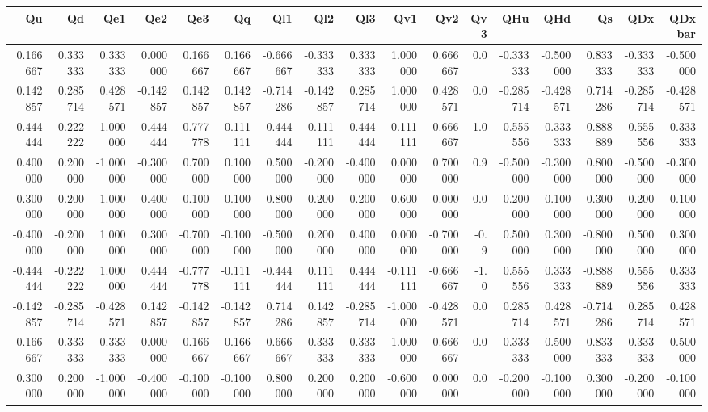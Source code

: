 \begin{tabular}{rrrrrrrrrrrrrrrrr}
\toprule
       Qu &        Qd &       Qe1 &       Qe2 &       Qe3 &        Qq &       Ql1 &       Ql2 &       Ql3 &       Qv1 &       Qv2 &  Qv3 &       QHu &       QHd &        Qs &       QDx &    QDxbar \\
\midrule
 0.166667 &  0.333333 &  0.333333 &  0.000000 &  0.166667 &  0.166667 & -0.666667 & -0.333333 &  0.333333 &  1.000000 &  0.666667 &  0.0 & -0.333333 & -0.500000 &  0.833333 & -0.333333 & -0.500000 \\
 0.142857 &  0.285714 &  0.428571 & -0.142857 &  0.142857 &  0.142857 & -0.714286 & -0.142857 &  0.285714 &  1.000000 &  0.428571 &  0.0 & -0.285714 & -0.428571 &  0.714286 & -0.285714 & -0.428571 \\
 0.444444 &  0.222222 & -1.000000 & -0.444444 &  0.777778 &  0.111111 &  0.444444 & -0.111111 & -0.444444 &  0.111111 &  0.666667 &  1.0 & -0.555556 & -0.333333 &  0.888889 & -0.555556 & -0.333333 \\
 0.400000 &  0.200000 & -1.000000 & -0.300000 &  0.700000 &  0.100000 &  0.500000 & -0.200000 & -0.400000 &  0.000000 &  0.700000 &  0.9 & -0.500000 & -0.300000 &  0.800000 & -0.500000 & -0.300000 \\
-0.300000 & -0.200000 &  1.000000 &  0.400000 &  0.100000 &  0.100000 & -0.800000 & -0.200000 & -0.200000 &  0.600000 &  0.000000 &  0.0 &  0.200000 &  0.100000 & -0.300000 &  0.200000 &  0.100000 \\
-0.400000 & -0.200000 &  1.000000 &  0.300000 & -0.700000 & -0.100000 & -0.500000 &  0.200000 &  0.400000 &  0.000000 & -0.700000 & -0.9 &  0.500000 &  0.300000 & -0.800000 &  0.500000 &  0.300000 \\
-0.444444 & -0.222222 &  1.000000 &  0.444444 & -0.777778 & -0.111111 & -0.444444 &  0.111111 &  0.444444 & -0.111111 & -0.666667 & -1.0 &  0.555556 &  0.333333 & -0.888889 &  0.555556 &  0.333333 \\
-0.142857 & -0.285714 & -0.428571 &  0.142857 & -0.142857 & -0.142857 &  0.714286 &  0.142857 & -0.285714 & -1.000000 & -0.428571 &  0.0 &  0.285714 &  0.428571 & -0.714286 &  0.285714 &  0.428571 \\
-0.166667 & -0.333333 & -0.333333 &  0.000000 & -0.166667 & -0.166667 &  0.666667 &  0.333333 & -0.333333 & -1.000000 & -0.666667 &  0.0 &  0.333333 &  0.500000 & -0.833333 &  0.333333 &  0.500000 \\
 0.300000 &  0.200000 & -1.000000 & -0.400000 & -0.100000 & -0.100000 &  0.800000 &  0.200000 &  0.200000 & -0.600000 &  0.000000 &  0.0 & -0.200000 & -0.100000 &  0.300000 & -0.200000 & -0.100000 \\
\bottomrule
\end{tabular}
